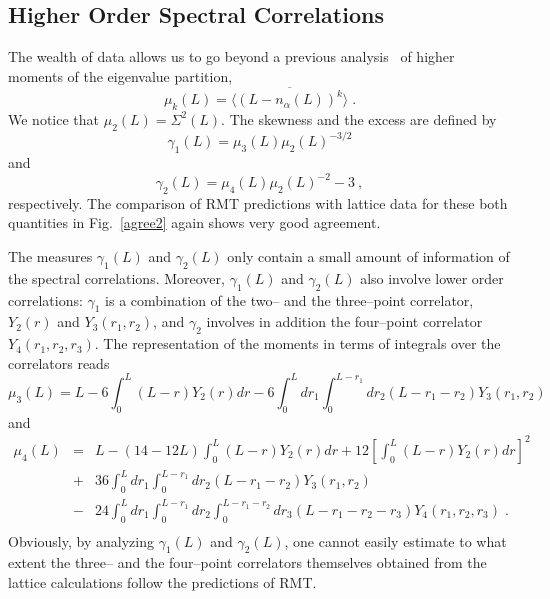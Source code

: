 \subsection{Higher Order Spectral Correlations}
\label{sec34}

The wealth of data allows us to go beyond a previous
analysis~\cite{halasz97} of higher moments of the eigenvalue
partition,
\begin{equation}
\mu_k(L)=\overline{\langle(L-n_{\alpha}(L))^k\rangle}\;.
\label{moments}
\end{equation}
We notice that $\mu_2(L)=\Sigma^2(L)$. The skewness and the excess
\cite{Mehta} are defined by
\begin{equation}
\gamma_1(L)=\mu_3(L)\mu_2(L)^{-3/2}
\label{skew}
\end{equation}
and
\begin{equation}
\gamma_2(L)=\mu_4(L)\mu_2(L)^{-2}-3 \ ,
\label{excess}
\end{equation}
respectively.  The comparison of RMT predictions with lattice data for
these both quantities in Fig.~\ref{agree2} again shows very good
agreement.

The measures $\gamma_1(L)$ and $\gamma_2(L)$ only contain a small
amount of information of the spectral correlations. Moreover,
$\gamma_1(L)$ and $\gamma_2(L)$ also involve lower order correlations:
$\gamma_1$ is a combination of the two-- and the three--point
correlator, $Y_2(r)$ and $Y_3(r_1,r_2)$, and $\gamma_2$ involves in
addition the four--point correlator $Y_4(r_1,r_2,r_3)$. The
representation of the moments in terms of integrals over the
correlators reads
\begin{equation}
\mu_3(L) =
L-6\int_{0}^{L}(L-r)Y_2(r)dr-6\int_{0}^{L}dr_1\int_{0}^{L-r_1}dr_2
(L-r_1-r_2)Y_3(r_1,r_2)
\label{mu3}
\end{equation}
and
\begin{eqnarray}
  \mu_4(L) & = & L-(14-12L)\int_{0}^{L}(L-r)Y_2(r)dr + 12 \left[
  \int_{0}^{L}(L-r)Y_2(r)dr \right]^{2} \nonumber \\ & + & 36
  \int_{0}^{L}dr_1\int_{0}^{L-r_1}dr_2(L-r_1-r_2)Y_3(r_1,r_2)
  \nonumber \\ & - &
  24\int_{0}^{L}dr_1\int_{0}^{L-r_1}dr_2\int_0^{L-r_1-r_2}
  dr_3(L-r_1-r_2-r_3)Y_4(r_1,r_2,r_3)\;.  \nonumber\\
\label{mu4}
\end{eqnarray}
Obviously, by analyzing $\gamma_1(L)$ and $\gamma_2(L)$, one cannot
easily estimate to what extent the three-- and the four--point
correlators themselves obtained from the lattice calculations follow
the predictions of RMT.

